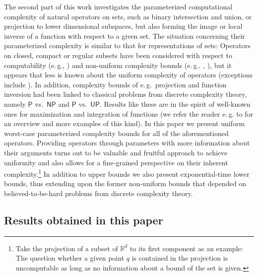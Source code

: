 \documentclass{CSML}
\newcommand{\IR}{\mathbb{R}}
\newcommand{\PTime}{\mathsf{P}}
\newcommand{\UPTime}{\mathsf{UP}}
\newcommand{\NPTime}{\mathsf{NP}}
\newcommand{\eg}{\mbox{e.\,g.}\xspace}
\begin{document}
The second part of this work investigates the parameterized computational complexity
of natural operators on sets, such as binary intersection and union,
or projection to lower dimensional subspaces, but also forming
the image or local inverse of a function with respect to a given set.
The situation concerning their parameterized complexity is similar to
that for representations of sets: Operators on closed, compact or regular
subsets have been considered with respect to computability (\eg,
\cite{zhou1996computable,Ziegler04:Operators,ziegler2004linalg})
and non-uniform complexity bounds (\eg,
\cite[Chap.~4]{Ko91}, \cite{KoYu08}),
but it appears that less is known about the uniform complexity of operators
(exceptions include
\cite{ZM08}).
In addition, complexity bounds of \eg~projection
and function inversion had been linked to classical problems from discrete
complexity theory, namely $\PTime$ vs.~$\NPTime$ and $\PTime$ vs.~$\UPTime$.
Results like these are in the spirit of well-known ones for maximization and
integration of functions \cite{KF82,Fried84} (we refer the reader \eg to
\cite{Ko98:Survey,BHW08:Tutorial} for an overview and more examples of
this kind).
%
In this paper we present uniform worst-case parameterized complexity bounds
for all of the aforementioned operators. Providing operators through
parameters with more information about their arguments turns out to be
valuable and fruitful approach to achieve uniformity and also allows for a
fine-grained perspective on their inherent complexity.\footnote{%
	Take the projection of a subset of $\IR^d$ to its first component as an
	example:
	The question whether a given point $q$ is contained in the projection is
	uncomputable as long as no information about a bound of the set is given.}
In addition to upper bounds we also present exponential-time lower bounds,
thus extending upon the former non-uniform bounds that depended on
believed-to-be-hard problems from discrete complexity theory.


\subsection*{Results obtained in this paper}
\end{document}
